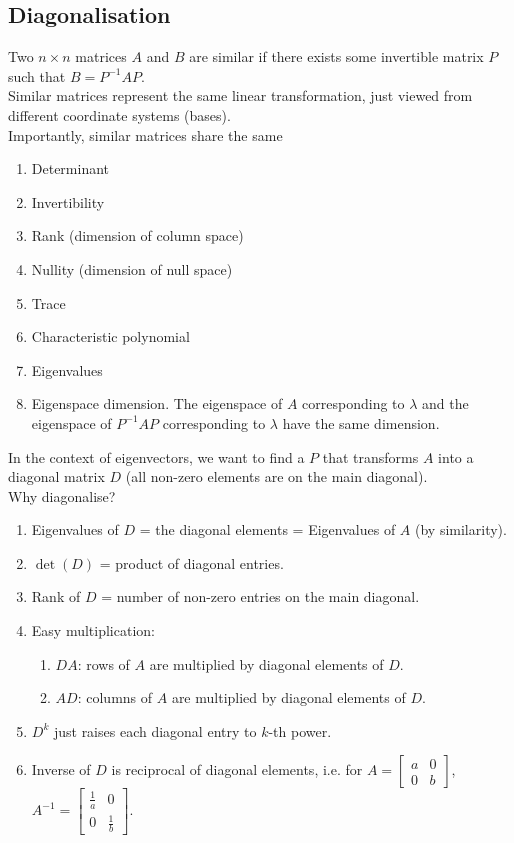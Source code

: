 \documentclass[../linear-algebra.tex]{subfiles}
\begin{document}
\subsection{Diagonalisation}
Two $n \times n$ matrices $A$ and $B$ are similar if there exists some invertible matrix $P$ such that $B = P^{-1}AP$.\\
Similar matrices represent the same linear transformation, just viewed from different coordinate systems (bases).\\
Importantly, similar matrices share the same
\begin{enumerate}
    \item Determinant
    \item Invertibility
    \item Rank (dimension of column space)
    \item Nullity (dimension of null space)
    \item Trace
    \item Characteristic polynomial
    \item Eigenvalues
    \item Eigenspace dimension. The eigenspace of $A$ corresponding to $\lambda$ and the eigenspace of $P^{-1}AP$ corresponding to $\lambda$ have the same dimension.
\end{enumerate}
In the context of eigenvectors, we want to find a $P$ that transforms $A$ into a diagonal matrix $D$ (all non-zero elements are on the main diagonal).\\
Why diagonalise?
\begin{enumerate}
    \item Eigenvalues of $D$ = the diagonal elements = Eigenvalues of $A$ (by similarity).
    \item $\det(D)$ = product of diagonal entries.
    \item Rank of $D$ = number of non-zero entries on the main diagonal.
    \item Easy multiplication:
    \begin{enumerate}
        \item $DA$: rows of $A$ are multiplied by diagonal elements of $D$.
        \item $AD$: columns of $A$ are multiplied by diagonal elements of $D$.
    \end{enumerate}
    \item $D^k$ just raises each diagonal entry to $k$-th power.
    \item Inverse of $D$ is reciprocal of diagonal elements, i.e. for $A = \begin{bmatrix}a & 0 \\ 0 & b\end{bmatrix}$, $A^{-1} = \begin{bmatrix}\frac{1}{a} & 0 \\ 0 & \frac{1}{b}\end{bmatrix}$.
\end{enumerate}
\end{document}
